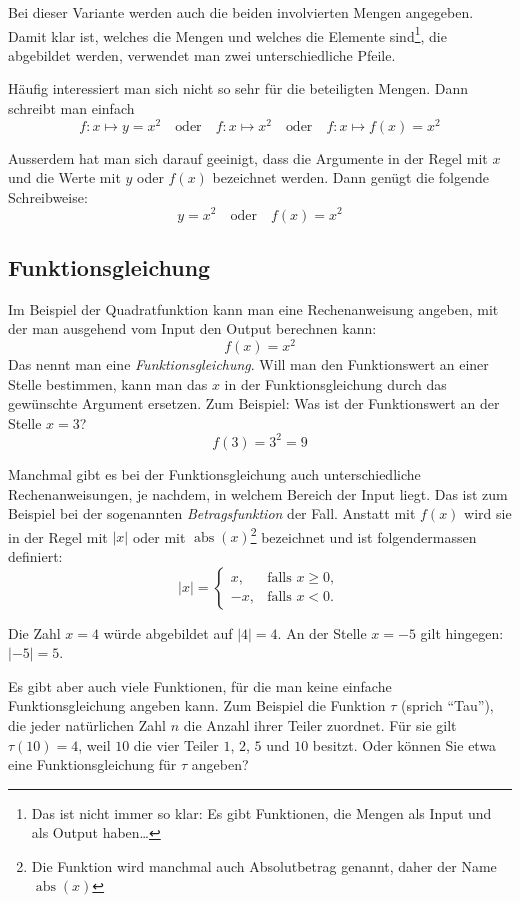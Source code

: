 Bei dieser Variante werden auch die beiden involvierten Mengen
angegeben. Damit klar ist, welches die Mengen und welches die
Elemente sind\footnote{Das ist nicht immer so klar: Es gibt Funktionen, die Mengen als Input und als Output haben\dots}, die abgebildet werden, verwendet man zwei
unterschiedliche Pfeile.

Häufig interessiert man sich nicht so sehr für die beteiligten
Mengen. Dann schreibt man einfach
\[
    f\colon x\longmapsto y=x^2
    \quad\text{oder}\quad
    f\colon x\longmapsto x^2
    \quad\text{oder}\quad
    f\colon x\longmapsto f(x)=x^2
\]

Ausserdem hat man sich darauf geeinigt, dass die Argumente in
der Regel mit \(x\) und die Werte mit \(y\) oder \(f(x)\)
bezeichnet werden. Dann genügt die folgende Schreibweise:
\[
    y=x^2
    \quad\text{oder}\quad
    f(x)=x^2
\]

\subsection*{Funktionsgleichung}\label{FuGl}

Im Beispiel der Quadratfunktion kann man eine Rechenanweisung
angeben, mit der man ausgehend vom Input den Output berechnen kann:
\[
    f(x)=x^2
\]
Das nennt man eine \emph{Funktionsgleichung}. Will man den Funktionswert
an einer Stelle bestimmen, kann man das \(x\) in der
Funktionsgleichung durch das gewünschte Argument ersetzen.
Zum Beispiel: Was ist der Funktionswert an der Stelle \(x=3\)?
\[
    f(3)=3^2=9
\]

Manchmal gibt es bei der Funktionsgleichung auch unterschiedliche
Rechenanweisungen, je nachdem, in welchem Bereich der Input liegt.
Das ist zum Beispiel bei der sogenannten \emph{Betragsfunktion}
der Fall. Anstatt mit \(f(x)\) wird sie in der Regel mit
\(|x|\) oder mit \(\operatorname{abs}(x)\)\footnote{Die Funktion wird manchmal auch Absolutbetrag genannt, daher der Name \(\operatorname{abs}(x)\)} bezeichnet und ist
folgendermassen definiert:
\[
    |x|=
    \begin{cases}
        x,  & \text{falls } x\geq 0, \\
        -x, & \text{falls } x<0.
    \end{cases}
\]

Die Zahl \(x=4\) würde abgebildet auf \(|4|=4\).
An der Stelle \(x=-5\) gilt hingegen: \(|-5|=5\).

Es gibt aber auch viele Funktionen, für die man keine einfache
Funktionsgleichung angeben kann. Zum Beispiel die Funktion
\(\tau\) (sprich \enquote{Tau}), die jeder natürlichen Zahl
\(n\) die Anzahl ihrer Teiler zuordnet. Für sie gilt
\(\tau(10)=4\), weil \(10\) die vier Teiler \(1\), \(2\), \(5\)
und \(10\) besitzt. Oder können Sie etwa eine Funktionsgleichung
für \(\tau\) angeben?

